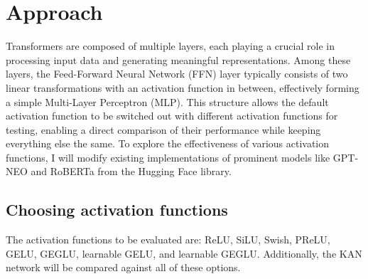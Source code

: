 \clearpage
\section{Approach}




Transformers are composed of multiple layers, each playing a crucial role in processing input data and generating meaningful representations. Among these layers, the Feed-Forward Neural Network (FFN) layer typically consists of two linear transformations with an activation function in between, effectively forming a simple Multi-Layer Perceptron (MLP). This structure allows the default activation function to be switched out with different activation functions for testing, enabling a direct comparison of their performance while keeping everything else the same. To explore the effectiveness of various activation functions, I will modify existing implementations of prominent models like GPT-NEO and RoBERTa from the Hugging Face library.

\subsection{Choosing activation functions}
The activation functions to be evaluated are: ReLU, SiLU, Swish, PReLU, GELU, GEGLU, learnable GELU, and learnable GEGLU. Additionally, the KAN network will be compared against all of these options.

